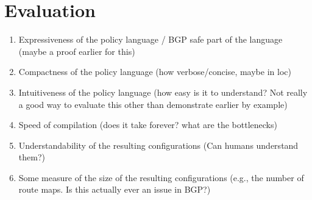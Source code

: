 \section{Evaluation}

\begin{enumerate}
	\item Expressiveness of the policy language / BGP safe part of the language (maybe a proof earlier for this)
	\item Compactness of the policy language (how verbose/concise, maybe in loc)
	\item Intuitiveness of the policy language (how easy is it to understand? Not really a good way to evaluate this other than demonstrate earlier by example)
	\item Speed of compilation (does it take forever? what are the bottlenecks)
	\item Understandability of the resulting configurations (Can humans understand them?)
	\item Some measure of the size of the resulting configurations (e.g., the number of route maps. Is this actually ever an issue in BGP?)
\end{enumerate}

